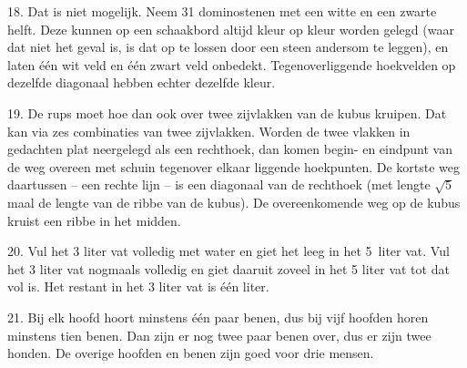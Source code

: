 \begin{problem}{18.}
    Dat is niet mogelijk. Neem 31 dominostenen met een witte en een zwarte helft. Deze kunnen op een schaakbord altijd kleur op kleur worden gelegd (waar dat niet het geval is, is dat op te lossen door een steen andersom te leggen), en laten één wit veld en één zwart veld onbedekt. Tegenoverliggende hoekvelden op dezelfde diagonaal hebben echter dezelfde kleur.
\end{problem}

\clearpage

\begin{problem}{19.}
    De rups moet hoe dan ook over twee zijvlakken van de kubus kruipen. Dat kan via zes combinaties van twee zijvlakken. Worden de twee vlakken in gedachten plat neergelegd als een rechthoek, dan komen begin- en eindpunt van de weg overeen met schuin tegenover elkaar liggende hoekpunten. De kortste weg daartussen -- een rechte lijn -- is een diagonaal van de rechthoek (met lengte $\sqrt{5}$ maal de lengte van de ribbe van de kubus). De overeenkomende weg op de kubus kruist een ribbe in het midden.
\end{problem}

\begin{problem}{20.}
    Vul het 3 liter vat volledig met water en giet het leeg in het 5~liter vat. Vul het 3 liter vat nogmaals volledig en giet daaruit zoveel in het 5 liter vat tot dat vol is. Het restant in het 3 liter vat is één liter.
\end{problem}

\begin{problem}{21.}
    Bij elk hoofd hoort minstens één paar benen, dus bij vijf hoofden horen minstens tien benen. Dan zijn er nog twee paar benen over, dus er zijn twee honden. De overige hoofden en benen zijn goed voor drie mensen.
\end{problem}

